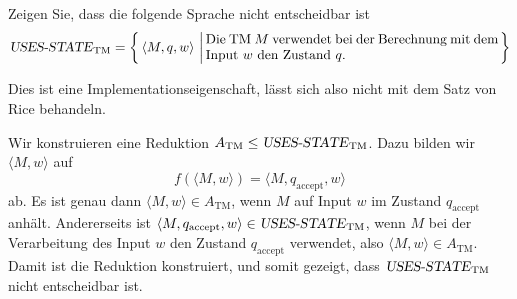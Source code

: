 Zeigen Sie, dass die folgende  Sprache nicht entscheidbar ist
\[
\text{\textsl{USES-STATE}}_{\text{TM}}=
\left\{
\,
\langle M,q,w\rangle \,\left|\,
\begin{minipage}{3truein}Die TM $M$ verwendet bei der Berechnung mit
dem Input $w$ den Zustand $q$.
\end{minipage}\right.
\right\}
\]

\begin{hinweis}
Dies ist eine Implementationseigenschaft, lässt sich
also nicht mit dem Satz von Rice behandeln.
\end{hinweis}

\begin{loesung}
Wir konstruieren eine Reduktion
$A_{\text{TM}}\le \text{\textsl{USES-STATE}}_{\text{TM}}$.
Dazu bilden wir
$\langle M,w\rangle$
auf
\[
f(\langle M,w\rangle)=
\langle M,q_{\text{accept}},w\rangle
\]
ab. Es ist genau dann
$\langle M,w\rangle\in A_{\text{TM}}$, wenn $M$ auf Input $w$ im
Zustand $q_{\text{accept}}$ anhält.
Andererseits ist
$\langle M,q_{\text{accept}},w\rangle\in 
\text{\textsl{USES-STATE}}_{\text{TM}}$,
wenn $M$ bei der Verarbeitung
des Input $w$ den Zustand $q_{\text{accept}}$ verwendet, also
$\langle M,w\rangle\in A_{\text{TM}}$.
Damit ist die Reduktion konstruiert, und somit gezeigt, dass
$\text{\textsl{USES-STATE}}_{\text{TM}}$ nicht entscheidbar ist.
\end{loesung}
